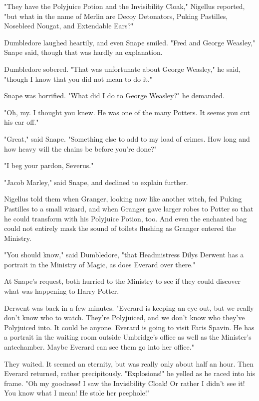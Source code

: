 \documentclass[a4paper,11pt]{article}
\begin{document}
"They have the Polyjuice Potion and the Invisibility Cloak," Nigellus reported, "but what in the name of Merlin are Decoy Detonators, Puking Pastilles, Nosebleed Nougat, and Extendable Ears?"

Dumbledore laughed heartily, and even Snape smiled. "Fred and George Weasley," Snape said, though that was hardly an explanation.

Dumbledore sobered. "That was unfortunate about George Weasley," he said, "though I know that you did not mean to do it."

Snape was horrified. "What did I do to George Weasley?" he demanded.

"Oh, my. I thought you knew. He was one of the many Potters. It seems you cut his ear off."

"Great," said Snape. "Something else to add to my load of crimes. How long and how heavy will the chains be before you're done?"

"I beg your pardon, Severus."

"Jacob Marley," said Snape, and declined to explain further.

Nigellus told them when Granger, looking now like another witch, fed Puking Pastilles to a small wizard, and when Granger gave larger robes to Potter so that he could transform with his Polyjuice Potion, too. And even the enchanted bag could not entirely mask the sound of toilets flushing as Granger entered the Ministry.

"You should know," said Dumbledore, "that Headmistress Dilys Derwent has a portrait in the Ministry of Magic, as does Everard over there."

At Snape's request, both hurried to the Ministry to see if they could discover what was happening to Harry Potter.

Derwent was back in a few minutes. "Everard is keeping an eye out, but we really don't know who to watch. They're Polyjuiced, and we don't know who they've Polyjuiced into. It could be anyone. Everard is going to visit Faris Spavin. He has a portrait in the waiting room outside Umbridge's office as well as the Minister's antechamber. Maybe Everard can see them go into her office."

They waited. It seemed an eternity, but was really only about half an hour. Then Everard returned, rather precipitously. "Explosions!" he yelled as he raced into his frame. "Oh my goodness! I saw the Invisibility Cloak! Or rather I didn't see it! You know what I mean! He stole her peephole!"
\end{document}
